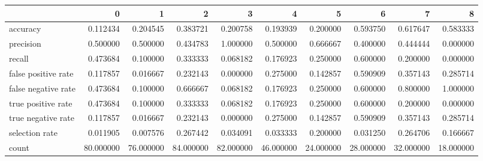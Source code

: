 \begin{tabular}{lrrrrrrrrr}
\toprule
{} &          0 &          1 &          2 &          3 &          4 &          5 &          6 &          7 &          8 \\
\midrule
accuracy            &   0.112434 &   0.204545 &   0.383721 &   0.200758 &   0.193939 &   0.200000 &   0.593750 &   0.617647 &   0.583333 \\
precision           &   0.500000 &   0.500000 &   0.434783 &   1.000000 &   0.500000 &   0.666667 &   0.400000 &   0.444444 &   0.000000 \\
recall              &   0.473684 &   0.100000 &   0.333333 &   0.068182 &   0.176923 &   0.250000 &   0.600000 &   0.200000 &   0.000000 \\
false positive rate &   0.117857 &   0.016667 &   0.232143 &   0.000000 &   0.275000 &   0.142857 &   0.590909 &   0.357143 &   0.285714 \\
false negative rate &   0.473684 &   0.100000 &   0.666667 &   0.068182 &   0.176923 &   0.250000 &   0.600000 &   0.800000 &   1.000000 \\
true positive rate  &   0.473684 &   0.100000 &   0.333333 &   0.068182 &   0.176923 &   0.250000 &   0.600000 &   0.200000 &   0.000000 \\
true negative rate  &   0.117857 &   0.016667 &   0.232143 &   0.000000 &   0.275000 &   0.142857 &   0.590909 &   0.357143 &   0.285714 \\
selection rate      &   0.011905 &   0.007576 &   0.267442 &   0.034091 &   0.033333 &   0.200000 &   0.031250 &   0.264706 &   0.166667 \\
count               &  80.000000 &  76.000000 &  84.000000 &  82.000000 &  46.000000 &  24.000000 &  28.000000 &  32.000000 &  18.000000 \\
\bottomrule
\end{tabular}
